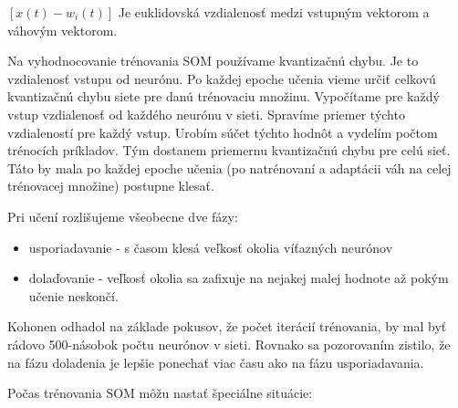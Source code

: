 $[x(t) - w_i(t)]$ Je euklidovská vzdialenosť medzi vstupným vektorom a váhovým vektorom.

Na vyhodnocovanie trénovania SOM používame kvantizačnú chybu. Je to vzdialenosť vstupu
od neurónu. 
Po každej epoche učenia vieme určiť celkovú kvantizačnú chybu siete pre danú trénovaciu množinu.
Vypočítame pre každý vstup vzdialenosť od každého neurónu v sieti. Spravíme priemer týchto vzdialeností pre každý vstup. Urobím súčet týchto hodnôt a vydelím počtom trénocích príkladov. 
Tým dostanem priemernu kvantizačnú chybu pre celú sieť. 
Táto by mala po každej epoche učenia (po natrénovaní a adaptácii váh na celej trénovacej množine) postupne klesať.

Pri učení rozlišujeme všeobecne dve fázy:
\begin{itemize}
	\item usporiadavanie - s časom klesá veľkosť okolia víťazných neurónov 
	\item dolaďovanie - veľkosť okolia sa zafixuje na nejakej malej hodnote až pokým učenie neskončí.
\end{itemize}

Kohonen odhadol na základe pokusov, že počet iterácií trénovania, by mal byť rádovo 500-násobok počtu neurónov v sieti.
Rovnako sa pozorovaním zistilo, že na fázu doladenia je lepšie ponechať viac času ako na fázu usporiadavania.

Počas trénovania SOM môžu nastať špeciálne situácie:

